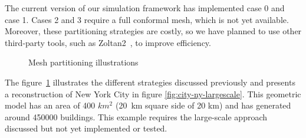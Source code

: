 \documentclass[runningheads]{llncs}
\begin{document}
The current version of our simulation framework has implemented case 0 and case 1. Cases 2 and 3 require a full conformal mesh, which is not yet available. Moreover, these partitioning strategies are costly, so we have planned to use other third-party tools, such as Zoltan2~\cite{the_zoltan2_team_zoltan2_nodate}, to improve efficiency.
\begin{figure}
\centering
{}
\caption{Mesh partitioning illustrations}
\label{fig:partitioning}
\end{figure}

The figure~\ref{fig:partitioning} illustrates the different strategies discussed previously and presents a reconstruction of New York City in figure \ref{fig:city-ny-largescale}. This geometric model has an area of 400 $km^2$ (20 km square side of 20 km) and has generated around 450000 buildings. This example requires the large-scale approach discussed but not yet implemented or tested. 
\end{document}
